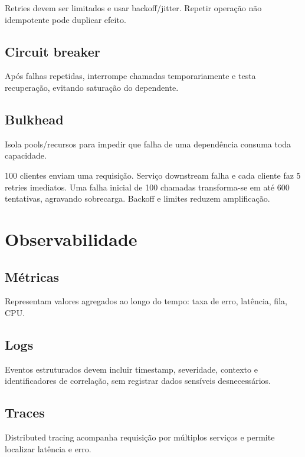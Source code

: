 Retries devem ser limitados e usar backoff/jitter. Repetir operação não idempotente pode duplicar efeito.

\subsection{Circuit breaker}

Após falhas repetidas, interrompe chamadas temporariamente e testa recuperação, evitando saturação do dependente.

\subsection{Bulkhead}

Isola pools/recursos para impedir que falha de uma dependência consuma toda capacidade.

\begin{exemplo}
100 clientes enviam uma requisição. Serviço downstream falha e cada cliente faz 5 retries imediatos. Uma falha inicial de 100 chamadas transforma-se em até 600 tentativas, agravando sobrecarga. Backoff e limites reduzem amplificação.
\end{exemplo}

\section{Observabilidade}

\subsection{Métricas}

Representam valores agregados ao longo do tempo: taxa de erro, latência, fila, CPU.

\subsection{Logs}

Eventos estruturados devem incluir timestamp, severidade, contexto e identificadores de correlação, sem registrar dados sensíveis desnecessários.

\subsection{Traces}

Distributed tracing acompanha requisição por múltiplos serviços e permite localizar latência e erro.

